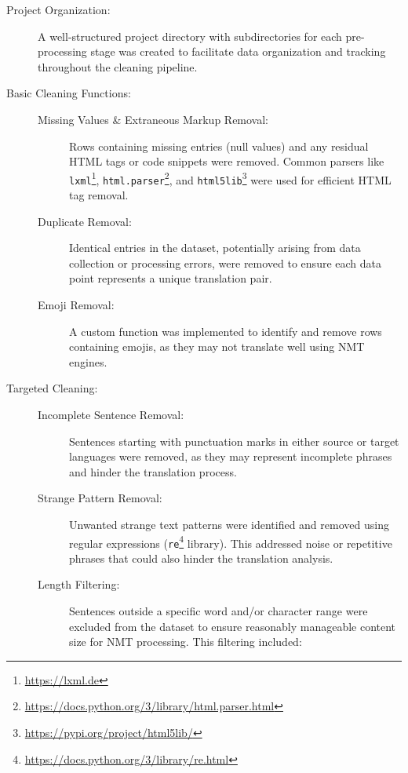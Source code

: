 \begin{description}
    \item[Project Organization:] A well-structured project directory with subdirectories for each pre-processing stage was created to facilitate data organization and tracking throughout the cleaning pipeline.
    \item[Basic Cleaning Functions:] 
    \begin{description}
        \item[Missing Values \& Extraneous Markup Removal:] Rows containing missing entries (null values) and any residual HTML tags or code snippets were removed. Common parsers like \texttt{lxml}\footnote{\href{https://lxml.de}{https://lxml.de}}, \texttt{html.parser}\footnote{\href{https://docs.python.org/3/library/html.parser.html}{https://docs.python.org/3/library/html.parser.html}}, and \texttt{html5lib}\footnote{\href{https://pypi.org/project/html5lib/}{https://pypi.org/project/html5lib/}} were used for efficient HTML tag removal.
        \item[Duplicate Removal:] Identical entries in the dataset, potentially arising from data collection or processing errors, were removed to ensure each data point represents a unique translation pair.
        \item[Emoji Removal:] A custom function was implemented to identify and remove rows containing emojis, as they may not translate well using NMT engines.
    \end{description}
    \item[Targeted Cleaning:]
    \begin{description}
        \item[Incomplete Sentence Removal:] Sentences starting with punctuation marks in either source or target languages were removed, as they may represent incomplete phrases and hinder the translation process.
        \item[Strange Pattern Removal:] Unwanted strange text patterns were identified and removed using regular expressions (\texttt{re}\footnote{\href{https://docs.python.org/3/library/re.html}{https://docs.python.org/3/library/re.html}} library). This addressed noise or repetitive phrases that could also hinder the translation analysis.
        \item[Length Filtering:] Sentences outside a specific word and/or character range were excluded from the dataset to ensure reasonably manageable content size for NMT processing. This filtering included:
        \begin{description}

\end{description}
\end{description}
\end{description}
